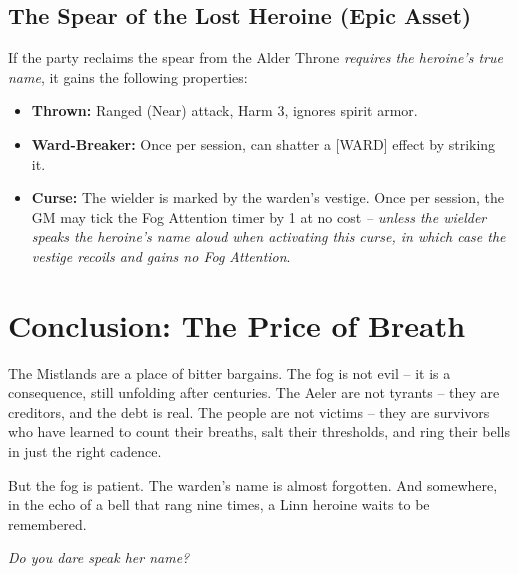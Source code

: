 \documentclass[12pt]{article}
\begin{document}
\subsection{The Spear of the Lost Heroine (Epic Asset)}
If the party reclaims the spear from the Alder Throne \textit{requires the heroine's true name}, it gains the following properties:
\begin{itemize}[leftmargin=*]
  \item \textbf{Thrown:} Ranged (Near) attack, Harm 3, ignores spirit armor.
  \item \textbf{Ward-Breaker:} Once per session, can shatter a [WARD] effect by striking it.
  \item \textbf{Curse:} The wielder is marked by the warden's vestige. Once per session, the GM may tick the Fog Attention timer by 1 at no cost \textit{-- unless the wielder speaks the heroine's name aloud when activating this curse, in which case the vestige recoils and gains no Fog Attention}.
\end{itemize}

\section{Conclusion: The Price of Breath}
The Mistlands are a place of bitter bargains. The fog is not evil -- it is a consequence, still unfolding after centuries. The Aeler are not tyrants -- they are creditors, and the debt is real. The people are not victims -- they are survivors who have learned to count their breaths, salt their thresholds, and ring their bells in just the right cadence.

But the fog is patient. The warden's name is almost forgotten. And somewhere, in the echo of a bell that rang nine times, a Linn heroine waits to be remembered.

\textit{Do you dare speak her name?}
\end{document}
